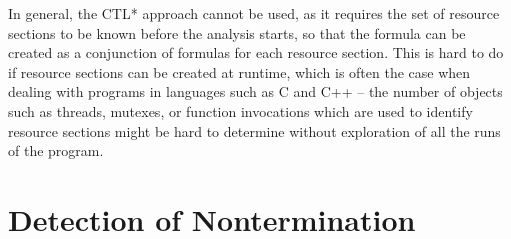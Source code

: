 In general, the CTL* approach cannot be used, as it requires the set of resource sections to be known before the analysis starts, so that the formula can be created as a conjunction of formulas for each resource section.
This is hard to do if resource sections can be created at runtime, which is often the case when dealing with programs in languages such as C and C++ -- the number of objects such as threads, mutexes, or function invocations which are used to identify resource sections might be hard to determine without exploration of all the runs of the program.

\section{Detection of Nontermination}\label{sec:detection}


